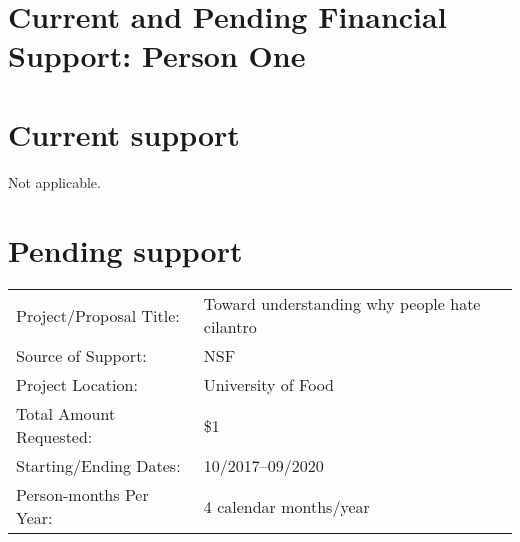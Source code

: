 
\section*{Current and Pending Financial Support: Person One}


\section*{Current support}
Not applicable.

\section*{Pending support}
\begin{tabular}{p{} p{}}
\hline
Project/Proposal Title:	& Toward understanding why people hate cilantro\\
Source of Support: 	& NSF\\
Project Location: 	& University of Food\\
Total Amount Requested: & \$1\\
Starting/Ending Dates: 	& 10/2017--09/2020\\
Person-months Per Year: & 4 calendar months/year\\
\hline
\end{tabular}
